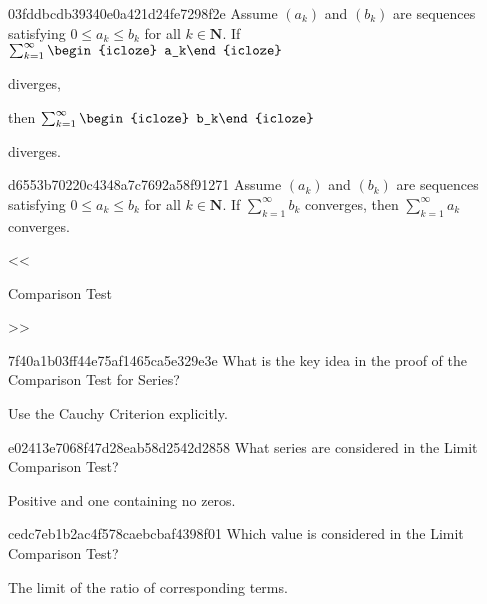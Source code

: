 \begin{note}{03fddbcdb39340e0a421d24fe7298f2e}
    Assume \({ (a_k) }\) and \({ (b_k) }\) are sequences satisfying \({ 0 \leq a_k \leq b_k }\) for all \({ k \in \mathbf{N} }\).
    If \({ \sum_{k=1}^{\infty} \begin{icloze}{1}a_k\end{icloze} }\) \begin{icloze}{2}diverges,\end{icloze} then \({ \sum_{k=1}^{\infty} \begin{icloze}{1}b_k\end{icloze} }\) \begin{icloze}{2}diverges.\end{icloze}
\end{note}

\begin{note}{d6553b70220c4348a7c7692a58f91271}
    Assume \({ (a_k) }\) and \({ (b_k) }\) are sequences satisfying \({ 0 \leq a_k \leq b_k }\) for all \({ k \in \mathbf{N} }\).
    If \({ \sum_{k=1}^{\infty} b_k }\) converges, then \({ \sum_{k=1}^{\infty} a_k }\) converges.

    \begin{center}
        \tiny
        <<\begin{icloze}{1}Comparison Test\end{icloze}>>
    \end{center}
\end{note}

\begin{note}{7f40a1b03ff44e75af1465ca5e329e3e}
    What is the key idea in the proof of the Comparison Test for Series?

    \begin{cloze}{1}
        Use the Cauchy Criterion explicitly.
    \end{cloze}
\end{note}

\begin{note}{e02413e7068f47d28eab58d2542d2858}
    What series are considered in the Limit Comparison Test?

    \begin{cloze}{1}
        Positive and one containing no zeros.
    \end{cloze}
\end{note}

\begin{note}{cedc7eb1b2ac4f578caebcbaf4398f01}
    Which value is considered in the Limit Comparison Test?

    \begin{cloze}{1}
        The limit of the ratio of corresponding terms.
    \end{cloze}
\end{note}

